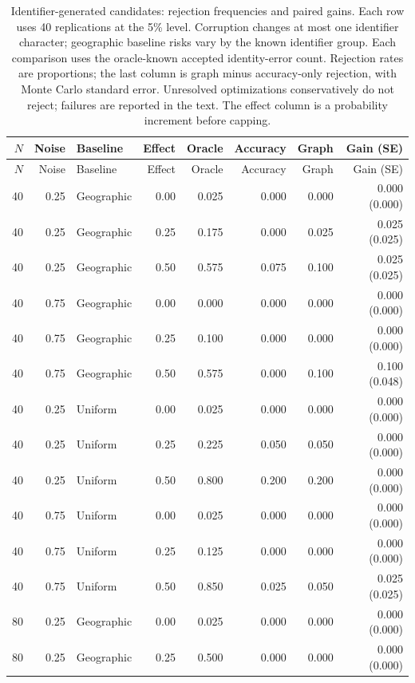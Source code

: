 \begin{center}\small
\setlength{\LTcapwidth}{\textwidth}
\begin{longtable}{rrlrrrrr}
\caption{Identifier-generated candidates: rejection frequencies and paired gains.
Each row uses 40 replications at the 5\% level.
Corruption changes at most one identifier
character; geographic baseline risks vary by the known identifier group. Each comparison
uses the oracle-known accepted identity-error count. Rejection rates are proportions;
the last column is graph minus accuracy-only rejection, with Monte Carlo standard error.
Unresolved optimizations conservatively do not reject; failures are reported in the text.
The effect column is a probability increment before capping.}\label{tab:identifier}\\
\toprule
$N$ & Noise & Baseline & Effect & Oracle & Accuracy & Graph & Gain (SE) \\
\midrule\endfirsthead
\toprule $N$ & Noise & Baseline & Effect & Oracle & Accuracy & Graph & Gain (SE) \\
\midrule\endhead
40 & 0.25 & Geographic & 0.00 & 0.025 & 0.000 & 0.000 & 0.000 (0.000) \\
40 & 0.25 & Geographic & 0.25 & 0.175 & 0.000 & 0.025 & 0.025 (0.025) \\
40 & 0.25 & Geographic & 0.50 & 0.575 & 0.075 & 0.100 & 0.025 (0.025) \\
40 & 0.75 & Geographic & 0.00 & 0.000 & 0.000 & 0.000 & 0.000 (0.000) \\
40 & 0.75 & Geographic & 0.25 & 0.100 & 0.000 & 0.000 & 0.000 (0.000) \\
40 & 0.75 & Geographic & 0.50 & 0.575 & 0.000 & 0.100 & 0.100 (0.048) \\
40 & 0.25 & Uniform & 0.00 & 0.025 & 0.000 & 0.000 & 0.000 (0.000) \\
40 & 0.25 & Uniform & 0.25 & 0.225 & 0.050 & 0.050 & 0.000 (0.000) \\
40 & 0.25 & Uniform & 0.50 & 0.800 & 0.200 & 0.200 & 0.000 (0.000) \\
40 & 0.75 & Uniform & 0.00 & 0.025 & 0.000 & 0.000 & 0.000 (0.000) \\
40 & 0.75 & Uniform & 0.25 & 0.125 & 0.000 & 0.000 & 0.000 (0.000) \\
40 & 0.75 & Uniform & 0.50 & 0.850 & 0.025 & 0.050 & 0.025 (0.025) \\
80 & 0.25 & Geographic & 0.00 & 0.025 & 0.000 & 0.000 & 0.000 (0.000) \\
80 & 0.25 & Geographic & 0.25 & 0.500 & 0.000 & 0.000 & 0.000 (0.000) \\

\end{longtable}
\end{center}
